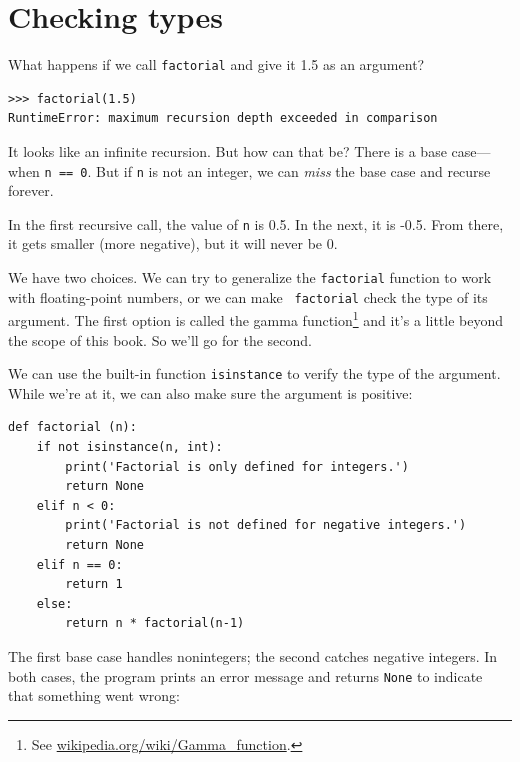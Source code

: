 \documentclass[10pt]{book}
\begin{document}


\section{Checking types}
\label{guardian}


What happens if we call {\tt factorial} and give it 1.5 as an argument?


\beforeverb
\begin{verbatim}
>>> factorial(1.5)
RuntimeError: maximum recursion depth exceeded in comparison
\end{verbatim}
\afterverb
%
It looks like an infinite recursion.  But how can that be?  There is a
base case---when {\tt n == 0}.  But if {\tt n} is not an integer,
we can {\em miss} the base case and recurse forever.


In the first recursive call, the value of {\tt n} is 0.5.
In the next, it is -0.5.  From there, it gets smaller
(more negative), but it will never be 0.

We have two choices.  We can try to generalize the {\tt factorial}
function to work with floating-point numbers, or we can make {\tt
  factorial} check the type of its argument.  The first option is
called the gamma function\footnote{See
  \url{wikipedia.org/wiki/Gamma_function}.} and it's a
little beyond the scope of this book.  So we'll go for the second.


We can use the built-in function {\tt isinstance} to verify the type
of the argument.  While we're at it, we can also make sure the
argument is positive:


\beforeverb
\begin{verbatim}
def factorial (n):
    if not isinstance(n, int):
        print('Factorial is only defined for integers.')
        return None
    elif n < 0:
        print('Factorial is not defined for negative integers.')
        return None
    elif n == 0:
        return 1
    else:
        return n * factorial(n-1)
\end{verbatim}
\afterverb
%
The first base case handles nonintegers; the
second catches negative integers.  In both cases, the program prints
an error message and returns {\tt None} to indicate that something
went wrong:
\end{document}

